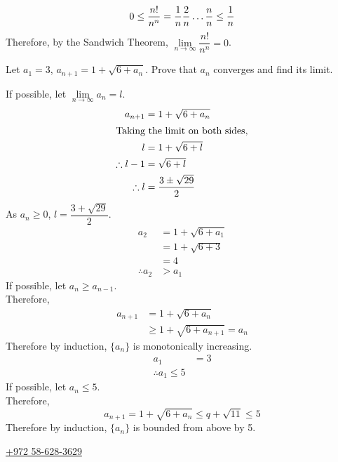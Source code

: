 \documentclass[fleqn, a4paper, 12pt, twoside]{article}
\theoremstyle{definition}
\theoremstyle{theorem}
\begin{document}
\begin{solution}[print]
	\begin{equation*}
		0 \leq \dfrac{n!}{n^n} = \dfrac{1}{n} \dfrac{2}{n} \dots \dfrac{n}{n} \leq \dfrac{1}{n}\\
	\end{equation*}
	Therefore, by the Sandwich Theorem, $\lim\limits_{n \to \infty} \dfrac{n!}{n^n} = 0$.
\end{solution}

\begin{question}
	Let $a_1 = 3$, $a_{n + 1} = 1 + \sqrt{6 + a_n}$. Prove that $a_n$ converges and find its limit.
\end{question}

\begin{solution}[print]
	If possible, let $\lim\limits_{n \to \infty} a_n = l$.
	\begin{align*}
		a_{n + 1} &= 1 + \sqrt{6 + a_n}\\
		\intertext{Taking the limit on both sides,}
		l &= 1 + \sqrt{6 + l}\\
		\therefore l - 1 &= \sqrt{6 + l}\\
		\therefore l &= \dfrac{3 \pm \sqrt{29}}{2}
	\end{align*}
	As $a_n \geq 0$, $l = \dfrac{3 + \sqrt{29}}{2}$.
	~\\
	\begin{align*}
		a_2 &= 1 + \sqrt{6 + a_1}\\
		&= 1 + \sqrt{6 + 3}\\
		&= 4\\
		\therefore a_2 &> a_1
	\end{align*}
	If possible, let $a_n \geq a_{n - 1}$.\\
	Therefore,
	\begin{align*}
		a_{n + 1} &= 1 + \sqrt{6 + a_n}\\
		&\geq 1 + \sqrt{6 + a_{n + 1}} = a_n
	\end{align*}
	Therefore by induction, $\{a_n\}$ is monotonically increasing.
	~\\
	\begin{align*}
		a_1 &= 3\\
		\therefore a_1 \leq 5
	\end{align*}
	If possible, let $a_n \leq 5$.\\
	Therefore,
	\begin{equation*}
		a_{n + 1} = 1 + \sqrt{6 + a_n} \leq q + \sqrt{11} \leq 5
	\end{equation*}
	Therefore by induction, $\{a_n\}$ is bounded from above by 5.
\end{solution}

\href{tel:+972586283629}{+972 58-628-3629}
\end{document}
